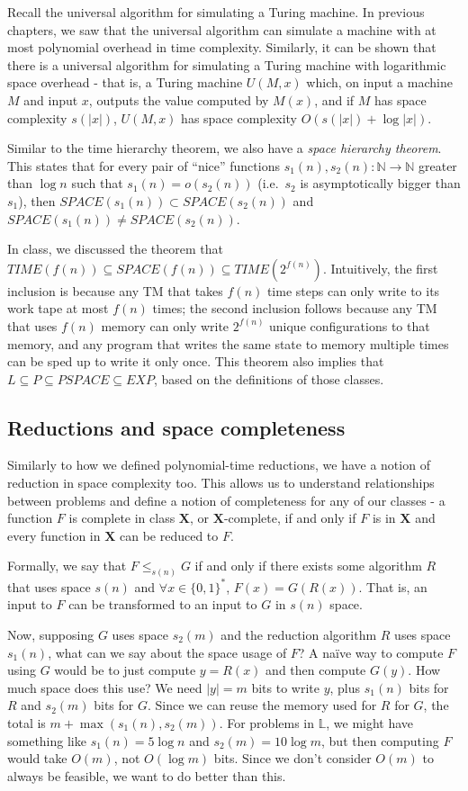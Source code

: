 \documentclass[10pt]{article}
\theoremstyle{definition}
\begin{document}
Recall the universal algorithm for simulating a Turing machine.  In previous chapters, we saw that the universal algorithm can simulate a machine with at most polynomial overhead in time complexity.  Similarly, it can be shown that there is a universal algorithm for simulating a Turing machine with logarithmic space overhead - that is, a Turing machine $U(M,x)$ which, on input a machine $M$ and input $x$, outputs the value computed by $M(x)$, and if $M$ has space complexity $s(|x|)$, $U(M,x)$ has space complexity $O(s(|x|) + \log |x|)$.

Similar to the time hierarchy theorem, we also have a \textit{space hierarchy theorem}.  This states that for every pair of ``nice'' functions $s_1(n), s_2(n) : \mathbb{N}\rightarrow\mathbb{N}$ greater than $\log n$ such that $s_1(n) = o(s_2(n))$ (i.e.\ $s_2$ is asymptotically bigger than $s_1$), then $SPACE(s_1(n)) \subset SPACE(s_2(n))$ and $SPACE(s_1(n)) \neq SPACE(s_2(n))$. 

In class, we discussed the theorem that $TIME(f(n)) \subseteq SPACE(f(n)) \subseteq TIME(2^{f(n)})$.  Intuitively, the first inclusion is because any TM that takes $f(n)$ time steps can only write to its work tape at most $f(n)$ times; the second inclusion follows because any TM that uses $f(n)$ memory can only write $2^{f(n)}$ unique configurations to that memory, and any program that writes the same state to memory multiple times can be sped up to write it only once.  This theorem also implies that $L \subseteq P \subseteq PSPACE \subseteq EXP$, based on the definitions of those classes.


\subsection{Reductions and space completeness}
Similarly to how we defined polynomial-time reductions, we have a notion of reduction in space complexity too.  This allows us to understand relationships between problems and define a notion of completeness for any of our classes - a function $F$ is complete in class $\mathbf{X}$, or $\mathbf{X}$-complete, if and only if $F$ is in $\mathbf{X}$ and every function in $\mathbf{X}$ can be reduced to $F$.

Formally, we say that $F \leq_{s(n)} G$ if and only if there exists some algorithm $R$ that uses space $s(n)$ and $\forall x \in \{0,1\}^*$, $F(x) = G(R(x))$.  That is, an input to $F$ can be transformed to an input to $G$ in $s(n)$ space.  

Now, supposing $G$ uses space $s_2(m)$ and the reduction algorithm $R$ uses space $s_1(n)$, what can we say about the space usage of $F$?  A na\"ive way to compute $F$ using $G$ would be to just compute $y = R(x)$ and then compute $G(y)$.  How much space does this use?  We need $|y| = m$ bits to write $y$, plus $s_1(n)$ bits for $R$ and $s_2(m)$ bits for $G$.  Since we can reuse the memory used for $R$ for $G$, the total is $m + \max(s_1(n), s_2(m))$.  For problems in $\mathbb{L}$, we might have something like $s_1(n) = 5 \log n$ and $s_2(m) = 10 \log m$, but then computing $F$ would take $O(m)$, not $O(\log m)$ bits.  Since we don't consider $O(m)$ to always be feasible, we want to do better than this.
\end{document}
